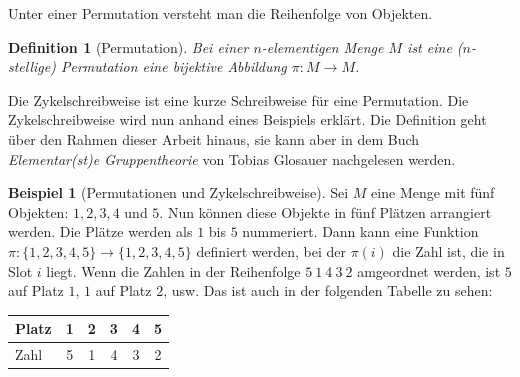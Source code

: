 \documentclass[12pt,a4paper, usenames, dvipsnames]{article}
\theoremstyle{mystyle}
\newtheorem{definition}{Definition}
\theoremstyle{definition}
\newtheorem{bsp}{Beispiel}[definition]
\begin{document}
Unter einer Permutation versteht man die Reihenfolge von Objekten.

\begin{definition}[Permutation]
Bei einer $n$-elementigen Menge $M$ ist eine ($n$-stellige) Permutation eine bijektive Abbildung $\pi  : M \rightarrow M$.
\end{definition}
Die Zykelschreibweise ist eine kurze Schreibweise für eine Permutation.
Die Zykelschreibweise wird nun anhand eines Beispiels erklärt. Die Definition geht über den Rahmen dieser Arbeit hinaus, sie kann aber in dem Buch \textit{Elementar(st)e Gruppentheorie} von Tobias Glosauer \cite{Buch} nachgelesen werden.

\begin{bsp}[Permutationen und Zykelschreibweise]
Sei $M$ eine Menge mit fünf Objekten: $1, 2, 3, 4$ und $5$. Nun können diese Objekte in fünf Plätzen arrangiert werden. Die Plätze werden als $1$ bis $5$ nummeriert. Dann kann eine Funktion $\pi :\{1,2,3,4,5\} \rightarrow \{1,2,3,4,5\}$ definiert werden, bei der $\pi (i)$ die Zahl ist, die in Slot $i$ liegt.
Wenn die Zahlen in der Reihenfolge $5 \ 1\ 4\ 3 \ 2$ amgeordnet werden, ist $5$ auf Platz $1$, $1$ auf Platz $2$, usw. Das ist auch in der folgenden Tabelle zu sehen: 

\begin{center}
\begin{tabular}{l ccccc}

Platz & 1 & 2 & 3 & 4 & 5 \\
\midrule
Zahl & 5 & 1 & 4 & 3 & 2 \\

\end{tabular}
\end{center}


\end{bsp}
\end{document}
